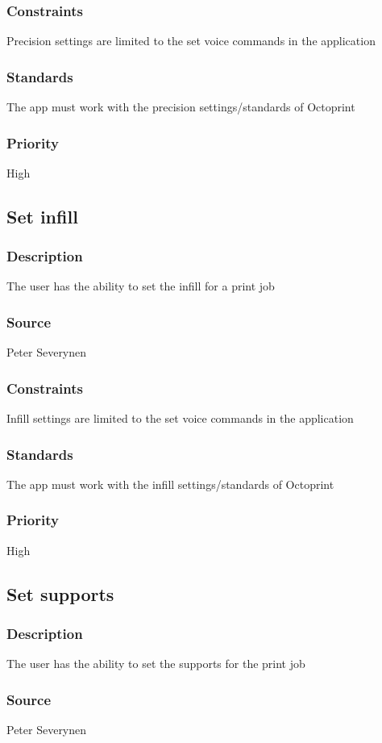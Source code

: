 \subsubsection{Constraints}
Precision settings are limited to the set voice commands in the application
\subsubsection{Standards}
The app must work with the precision settings/standards of Octoprint
\subsubsection{Priority}
High
\subsection{Set infill}
\subsubsection{Description}
The user has the ability to set the infill for a print job
\subsubsection{Source}
Peter Severynen
\subsubsection{Constraints}
Infill settings are limited to the set voice commands in the application
\subsubsection{Standards}
The app must work with the infill settings/standards of Octoprint
\subsubsection{Priority}
High
\subsection{Set supports}
\subsubsection{Description}
The user has the ability to set the supports for the print job
\subsubsection{Source}
Peter Severynen
